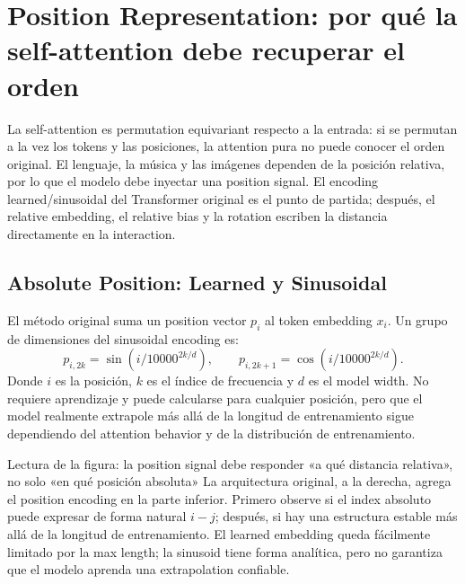 \section{Position Representation: por qué la self-attention debe recuperar el orden}

La self-attention es permutation equivariant respecto a la entrada: si se permutan a la vez los tokens y las posiciones, la attention pura no puede conocer el orden original. El lenguaje, la música y las imágenes dependen de la posición relativa, por lo que el modelo debe inyectar una position signal. El encoding learned/sinusoidal del Transformer original es el punto de partida; después, el relative embedding, el relative bias y la rotation escriben la distancia directamente en la interaction.

\subsection{Absolute Position: Learned y Sinusoidal}

El método original suma un position vector $p_i$ al token embedding $x_i$. Un grupo de dimensiones del sinusoidal encoding es:
\[
p_{i,2k}=\sin\!\left(i/10000^{2k/d}\right),\qquad
p_{i,2k+1}=\cos\!\left(i/10000^{2k/d}\right).
\]
Donde $i$ es la posición, $k$ es el índice de frecuencia y $d$ es el model width. No requiere aprendizaje y puede calcularse para cualquier posición, pero que el model realmente extrapole más allá de la longitud de entrenamiento sigue dependiendo del attention behavior y de la distribución de entrenamiento.


\begin{knowledgebox}{Lectura de la figura: la position signal debe responder «a qué distancia relativa», no solo «en qué posición absoluta»}
La arquitectura original, a la derecha, agrega el position encoding en la parte inferior. Primero observe si el index absoluto puede expresar de forma natural $i-j$; después, si hay una estructura estable más allá de la longitud de entrenamiento. El learned embedding queda fácilmente limitado por la max length; la sinusoid tiene forma analítica, pero no garantiza que el modelo aprenda una extrapolation confiable.
\end{knowledgebox}


